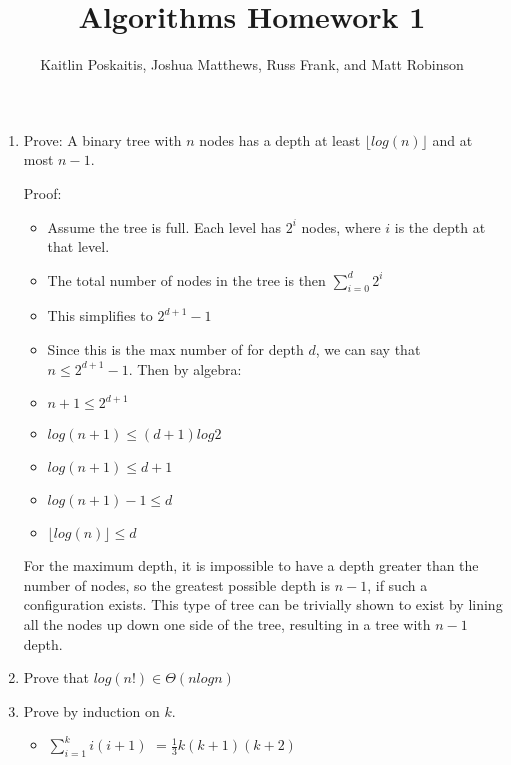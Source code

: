 \documentclass[12pt]{article}
\title{\bf Algorithms Homework 1}
\author{Kaitlin Poskaitis, Joshua Matthews, Russ Frank, and Matt Robinson}
\date{}
\begin{document}
\maketitle

\begin{enumerate}
\item Prove: A binary tree with $n$ nodes has a depth at least $\lfloor
log(n) \rfloor$ and at most $n - 1$.

Proof:

\begin{itemize}

    \item Assume the tree is full. Each level has $2^i$ nodes, where $i$ is the
        depth at that level.

    \item The total number of nodes in the tree is then
        $\displaystyle\sum\limits_{i=0}^d 2^i$

    \item This simplifies to $2^{d+1}-1$

    \item Since this is the max number of for depth $d$, we can say that $n \leq
        2^{d+1}-1$. Then by algebra:

    \item $n+1 \leq 2^{d+1}$

    \item $log(n+1) \leq (d+1)log2$

    \item $log(n+1) \leq d+1$

    \item $log(n+1) - 1 \leq d$


    \item $\lfloor log(n) \rfloor \leq d$

\end{itemize}

For the maximum depth, it is impossible to have a depth greater than the number
of nodes, so the greatest possible depth is $n-1$, if such a configuration
exists. This type of tree can be trivially shown to exist by lining all the
nodes up down one side of the tree, resulting in a tree with $n-1$ depth.

\item Prove that $log(n!) \in \Theta(nlogn)$

\item Prove by induction on $k$.
\begin{itemize}
\item  $\displaystyle\sum\limits_{i=1}^k i(i+1) $ $= \frac{1}{3}k(k+1)(k+2)$\\


\end{itemize}
\end{enumerate}
\end{document}
